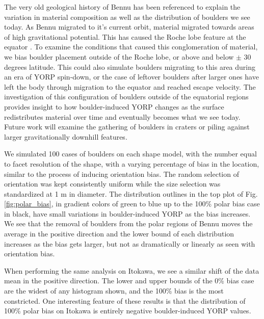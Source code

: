 The very old geological history of Bennu has been referenced to explain the variation in material composition as well as the distribution of boulders we see today. As Bennu migrated to it's current orbit, material migrated towards areas of high gravitational potential. This has caused the Roche lobe feature at the equator \cite{Scheeres2019}. To examine the conditions that caused this conglomeration of material, we bias boulder placement outside of the Roche lobe, or above and below $\pm$ 30 degrees latitude. This could also simulate boulders migrating to this area during an era of YORP spin-down, or the case of leftover boulders after larger ones have left the body through migration to the equator and reached escape velocity. The investigation of this configuration of boulders outside of the equatorial regions provides insight to how boulder-induced YORP changes as the surface redistributes material over time and eventually becomes what we see today. Future work will examine the gathering of boulders in craters or piling against larger gravitationally downhill features.

We simulated 100 cases of boulders on each shape model, with the number equal to facet resolution of the shape, with a varying percentage of bias in the location, similar to the process of inducing orientation bias. The random selection of orientation was kept consistently uniform while the size selection was standardized at 1 m in diameter. The distribution outlines in the top plot of Fig.\ref{fig:polar_bias}, in gradient colors of green to blue up to the 100\% polar bias case in black, have small variations in boulder-induced YORP as the bias increases. We see that the removal of boulders from the polar regions of Bennu moves the average in the positive direction and the lower bound of each distribution increases as the bias gets larger, but not as dramatically or linearly as seen with orientation bias. 

When performing the same analysis on Itokawa, we see a similar shift of the data mean in the positive direction. The lower and upper bounds of the 0\% bias case are the widest of any histogram shown, and the 100\% bias is the most constricted. One interesting feature of these results is that the distribution of 100\% polar bias on Itokawa is entirely negative boulder-induced YORP values. 

